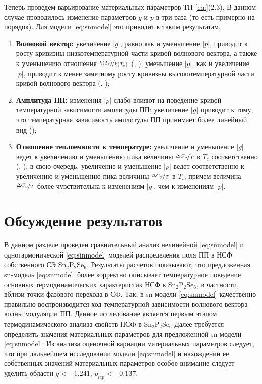 Теперь проведем варьирование материальных параметров ТП \eqref{eq:}(2.3). В данном случае проводилось изменение параметров $g$ и $p$ в три раза (то есть примерно на порядок). Для модели \eqref{eq:snmodel} это приводит к таким результатам.
\begin{enumerate}
\item
\textbf{Волновой вектор:} увеличение $|g|$, равно как и уменьшение $|p|$, приводит к росту кривизны низкотемпературной части кривой волнового вектора, а также к уменьшению отношения $\nicefrac{k(T_i)}{k(T_c)}$ (, ); уменьшение $|g|$, как и увеличение $|p|$, приводит к менее заметному росту кривизны высокотемпературной части кривой волнового вектора (, );
\item
\textbf{Амплитуда ПП:} изменения $|p|$ слабо влияют на поведение кривой температурной зависимости амплитуды ПП; увеличение $|g|$ приводит к тому, что температурная зависимость амплитуды ПП принимает более линейный вид ();
\item
\textbf{Отношение теплоемкости к температуре:} увеличение и уменьшение $|g|$ ведет к увеличению и уменьшению пика величины $\nicefrac{\Delta C_p}{T}$ в $T_c$ соответственно (, ); в свою очередь, увеличение и уменьшение $|p|$ ведет соответственно к увеличению и уменьшению пика величины $\nicefrac{\Delta C_p}{T}$ в $T_i$, причем величина $\nicefrac{\Delta C_p}{T}$ более чувствительна к изменениям $|g|$, чем к изменениям $|p|$.
\end{enumerate}

%


\section{Обсуждение результатов}\label{sec:discuss}

В данном разделе проведен сравнительный анализ нелинейной \eqref{eq:snmodel} и одногармонической \eqref{eq:sinmodel} моделей распределения поля ПП в НСФ собственного СЭ Sn$_2$P$_2$Se$_6$. Результаты расчетов показывают, что предложенная sn-модель \eqref{eq:snmodel} более корректно описывает температурное поведение основных термодинамических характеристик НСФ в Sn$_2$P$_2$Se$_6$, в частности, вблизи точки фазового перехода в СФ. Так, в sn-модели \eqref{eq:snmodel} качественно правильно воспроизводится ход температурной зависимости волнового вектора волны модуляции ПП.
Данное исследование является первым этапом термодинамического анализа свойств НСФ в Sn$_2$P$_2$Se$_6$ Далее требуется определить значения материальных параметров для предложенной sn-модели \eqref{eq:snmodel}. Из анализа оценочной вариации материальных параметров следует, что при дальнейшем исследовании модели \eqref{eq:snmodel} и нахождении ее собственных значений материальных параметров особое внимание следует уделить области $g < -1.241,\, p_{icp} < -0.137$.

